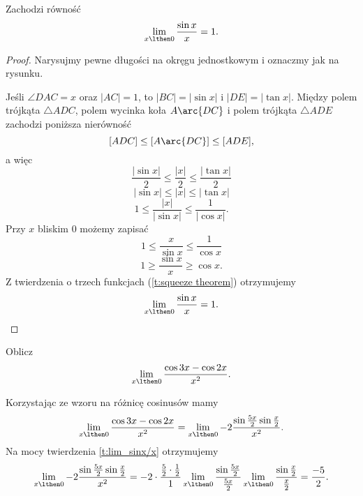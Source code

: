 \begin{theorem}
    \label{t:lim_sinx/x}
    Zachodzi równość
    \[ \lim_{x \lthen 0}\frac{\sin{x}}{x} = 1. \]
\end{theorem}
\begin{proof}
    Narysujmy pewne długości na okręgu jednostkowym i oznaczmy jak na rysunku.
    \begin{center}
    \end{center}
    Jeśli $\angle DAC = x$ oraz $|AC| = 1$, to $|BC| = |\sin x|$ i $|DE| = |\tan x|$. Między polem trójkąta $\triangle ADC$, polem wycinka koła $A\arc{DC}$ i polem trójkąta $\triangle ADE$ zachodzi poniższa nierówność
    \[ [ADC] \leq [A\arc{DC}] \leq [ADE], \]
    a więc
    \[ \frac{|\sin x|}{2} \leq \frac{|x|}{2} \leq \frac{|\tan x|}{2} \]
    \[ |\sin x| \leq |x| \leq |\tan x| \]
    \[ 1 \leq \frac{|x|}{|\sin{x}|} \leq \frac{1}{|\cos x|}. \]
    Przy $x$ bliskim $0$ możemy zapisać
    \[ 1 \leq \frac{x}{\sin{x}} \leq \frac{1}{\cos x} \]
    \[ 1 \geq \frac{\sin{x}}{x} \geq \cos x. \]
    Z twierdzenia o trzech funkcjach (\ref{t:squeeze theorem}) otrzymujemy
    \[ \lim_{x \lthen 0} \frac{\sin{x}}{x} = 1. \]
\end{proof}

\begin{example}
    Oblicz
    \[ \lim_{x \lthen 0} \frac{\cos{3x} - \cos{2x}}{x^2}. \]
\end{example}
\begin{solution}
    Korzystając ze wzoru na różnicę cosinusów mamy
    \[ \lim_{x \lthen 0} \frac{\cos{3x} - \cos{2x}}{x^2} = \lim_{x \lthen 0} -2\frac{\sin\frac{5x}{2}\sin\frac{x}{2}}{x^2}. \]
    Na mocy twierdzenia \ref{t:lim_sinx/x} otrzymujemy
    \[ \lim_{x \lthen 0} -2\frac{\sin\frac{5x}{2}\sin\frac{x}{2}}{x^2} = -2\cdot\frac{\frac{5}{2}\cdot\frac{1}{2}}{1}\lim_{x\lthen 0}\frac{\sin\frac{5x}{2}}{\frac{5x}{2}}\lim_{x\lthen 0}\frac{\sin\frac{x}{2}}{\frac{x}{2}} =  \frac{-5}{2}. \]
\end{solution}

